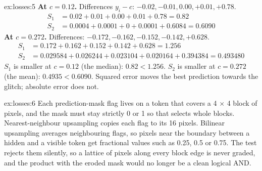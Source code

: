 \begin{solution}{ex:losses:5}
\textbf{At $c = 0.12$.} Differences $y_i - c$: $-0.02, -0.01, 0.00, +0.01, +0.78$.
\begin{align*}
S_1 &= 0.02 + 0.01 + 0.00 + 0.01 + 0.78 = 0.82\\
S_2 &= 0.0004 + 0.0001 + 0 + 0.0001 + 0.6084 = 0.6090
\end{align*}
\textbf{At $c = 0.272$.} Differences: $-0.172, -0.162, -0.152, -0.142, +0.628$.
\begin{align*}
S_1 &= 0.172 + 0.162 + 0.152 + 0.142 + 0.628 = 1.256\\
S_2 &= 0.029584 + 0.026244 + 0.023104 + 0.020164 + 0.394384 = 0.493480
\end{align*}
$S_1$ is smaller at $c = 0.12$ (the median): $0.82 < 1.256$. $S_2$ is smaller at $c = 0.272$
(the mean): $0.4935 < 0.6090$. Squared error moves the best prediction towards the glitch;
absolute error does not.
\end{solution}

\begin{solution}{ex:losses:6}
Each prediction-mask flag lives on a token that covers a 4 $\times$ 4 block of pixels, and the
mask must stay strictly 0 or 1 so that  selects whole blocks.
Nearest-neighbour upsampling copies each flag to its 16 pixels. Bilinear upsampling averages
neighbouring flags, so pixels near the boundary between a hidden and a visible token get
fractional values such as 0.25, 0.5 or 0.75. The test  rejects them
silently, so a lattice of pixels along every block edge is never graded, and the product with
the eroded mask would no longer be a clean logical AND.
\end{solution}
